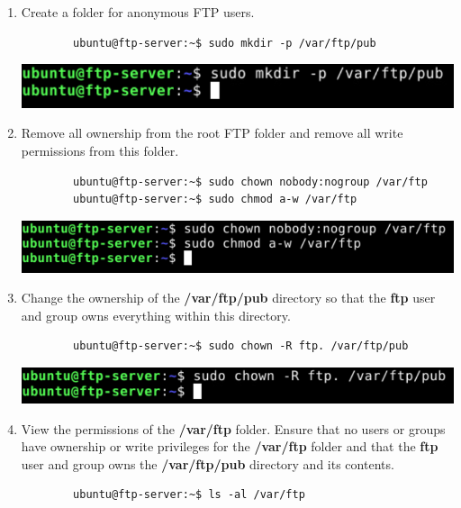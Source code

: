 \documentclass[letterpaper, 12pt]{article}
\begin{document}
\begin{enumerate}
    \item Create a folder for anonymous FTP users.
    \begin{lstlisting}
        ubuntu@ftp-server:~$ sudo mkdir -p /var/ftp/pub
    \end{lstlisting}

    \begin{center}
        \includegraphics[width=\linewidth]{images/part2/step11.png}
    \end{center}

    \item Remove all ownership from the root FTP folder and remove all write permissions from this folder.
    \begin{lstlisting}
        ubuntu@ftp-server:~$ sudo chown nobody:nogroup /var/ftp
        ubuntu@ftp-server:~$ sudo chmod a-w /var/ftp
    \end{lstlisting}

    \begin{center}
        \includegraphics[width=\linewidth]{images/part2/step12.png}
    \end{center}

    \item Change the ownership of the \textbf{/var/ftp/pub} directory so that the \textbf{ftp} user and group owns everything within this directory.
    \begin{lstlisting}
        ubuntu@ftp-server:~$ sudo chown -R ftp. /var/ftp/pub
    \end{lstlisting}

    \begin{center}
        \includegraphics[width=\linewidth]{images/part2/step13.png}
    \end{center}

    \item View the permissions of the \textbf{/var/ftp} folder.
    Ensure that no users or groups have ownership or write privileges for the \textbf{/var/ftp} folder and that the \textbf{ftp} user and group owns the \textbf{/var/ftp/pub} directory and its contents.
    \begin{lstlisting}
        ubuntu@ftp-server:~$ ls -al /var/ftp
    \end{lstlisting}


\end{enumerate}
\end{document}
